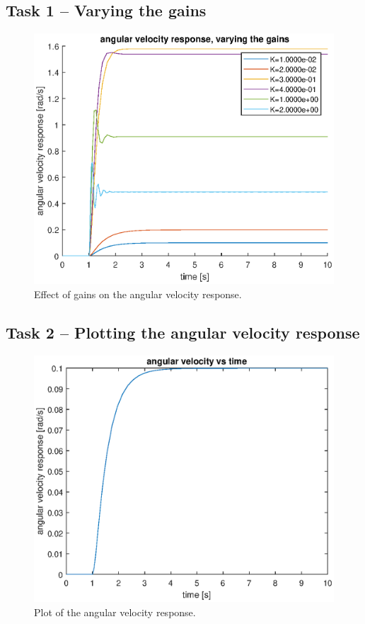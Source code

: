 \documentclass[12pt]{article}
\begin{document}
\subsection{Task 1 -- Varying the gains}

\begin{figure}
    \centering
    \includegraphics[width=\linewidth]{img/task01_varying_gains.eps}
    \caption{Effect of gains on the angular velocity response.}
    \label{fig:gains on angular velocity}
\end{figure}

\subsection{Task 2 -- Plotting the angular velocity response}

\begin{figure}
    \centering
    \includegraphics[width=\linewidth]{img/task02_plot_angular_velocity.eps}
    \caption{Plot of the angular velocity response.}
    \label{fig:plot of angular velocity}
\end{figure}
\end{document}
